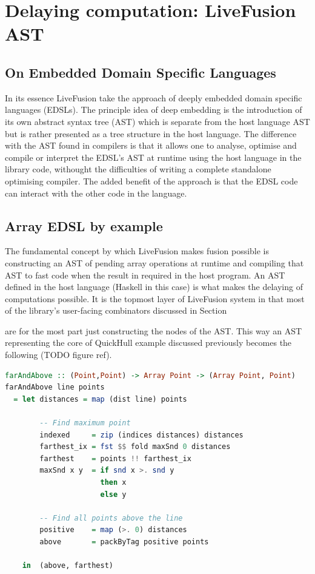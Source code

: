 \documentclass[preamble.tex]{subfiles}
\begin{document}
\pagebreak
\section{Delaying computation: LiveFusion AST}

\subsection{On Embedded Domain Specific Languages}
In its essence LiveFusion take the approach of deeply embedded domain specific languages (EDSLs). The principle idea of deep embedding is the introduction of its own abstract syntax tree (AST) which is separate from the host language AST but is rather presented as a tree structure in the host language. The difference with the AST found in compilers is that it allows one to analyse, optimise and compile or interpret the EDSL's AST at runtime using the host language in the library code, withought the difficulties of writing a complete standalone optimising compiler. The added benefit of the approach is that the EDSL code can interact with the other code in the language. 

\subsection{Array EDSL by example}
The fundamental concept by which LiveFusion makes fusion possible is constructing an AST of pending array operations at runtime and compiling that AST to fast code when the result in required in the host program. An AST defined in the host language (Haskell in this case) is what makes the delaying of computations possible. It is the topmost layer of LiveFusion system in that most of the library's user-facing combinators discussed in Section  are for the most part just constructing the nodes of the AST. This way an AST representing the core of QuickHull example discussed previously becomes the following (TODO figure ref).

\begin{lstlisting}[basicstyle={\ttfamily},language=Haskell]
farAndAbove :: (Point,Point) -> Array Point -> (Array Point, Point)
farAndAbove line points
  = let distances = map (dist line) points

        -- Find maximum point
        indexed     = zip (indices distances) distances
        farthest_ix = fst $$ fold maxSnd 0 distances
        farthest    = points !! farthest_ix
        maxSnd x y  = if snd x >. snd y
                      then x
                      else y

        -- Find all points above the line
        positive    = map (>. 0) distances
        above       = packByTag positive points

    in  (above, farthest)
\end{lstlisting}
\end{document}
